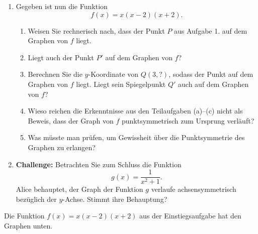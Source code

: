 \begin{LA}
\begin{enumerate}
\begin{center}
\begin{tikzpicture}[x=1cm,y=1cm,>=stealth, scale = 0.7]
                  \end{tikzpicture}
              \end{center}

              Wohin kommt der Punkt \(P\) zu liegen nach einer Punktspiegelung
              mit Zentrum im Ursprung \(O=(0, 0)\)?
              Geben Sie die Koordinaten des Bildpunktes \(P'\) an:

        \item Gegeben ist nun die Funktion
              \[
                  f(x)=x(x-2)(x+2).
              \]

              \begin{enumerate}
                  \item Weisen Sie rechnerisch nach, dass der Punkt \(P\)
                        aus Aufgabe 1. auf dem Graphen von \(f\) liegt.

                  \item Liegt auch der Punkt \(P'\) auf dem Graphen von \(f\)?

                  \item Berechnen Sie die \(y\)-Koordinate von \(Q(3, ?)\),
                        sodass der Punkt auf dem Graphen von \(f\) liegt.
                        Liegt sein Spiegelpunkt \(Q'\) auch auf dem Graphen von \(f\)?

                  \item Wieso reichen die Erkenntnisse aus den Teilaufgaben
                        (a)--(c) nicht als Beweis, dass der Graph von \(f\)
                        punktsymmetrisch zum Ursprung verläuft?

                  \item Was müsste man prüfen, um Gewissheit über die
                        Punktsymmetrie des Graphen zu erlangen?
              \end{enumerate}

        \item \textbf{Challenge:} Betrachten Sie zum Schluss die Funktion
              \[
                  g(x)=\frac{1}{x^2+1}.
              \]
              Alice behauptet, der Graph der Funktion \(g\)
              verlaufe achsensymmetrisch bezüglich der \(y\)-Achse.
              Stimmt ihre Behauptung?

    \end{enumerate}
\end{LA}

\clearpage

Die Funktion \(f(x)=x(x-2)(x+2)\) aus der Einstiegsaufgabe
hat den Graphen unten.

